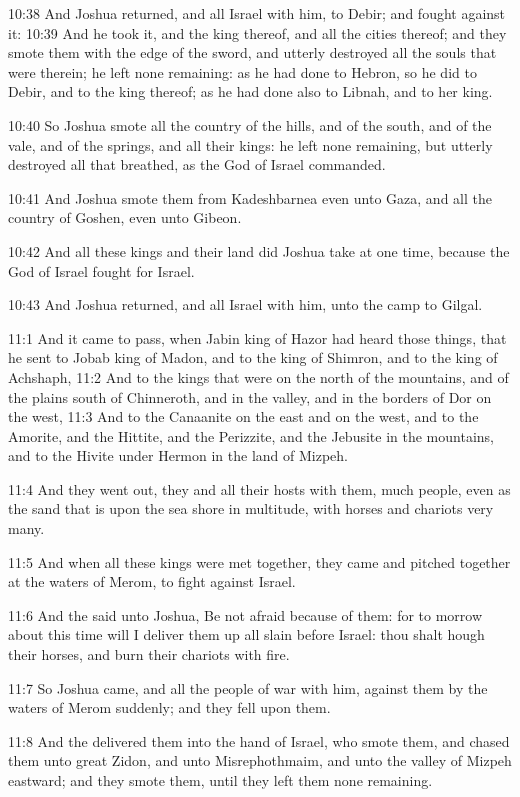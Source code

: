 10:38 And Joshua returned, and all Israel with him, to Debir; and fought against it: 10:39 And he took it, and the king thereof, and all the cities thereof; and they smote them with the edge of the sword, and utterly destroyed all the souls that were therein; he left none remaining: as he had done to Hebron, so he did to Debir, and to the king thereof; as he had done also to Libnah, and to her king.

10:40 So Joshua smote all the country of the hills, and of the south, and of the vale, and of the springs, and all their kings: he left none remaining, but utterly destroyed all that breathed, as the \LORD God of Israel commanded.

10:41 And Joshua smote them from Kadeshbarnea even unto Gaza, and all the country of Goshen, even unto Gibeon.

10:42 And all these kings and their land did Joshua take at one time, because the \LORD God of Israel fought for Israel.

10:43 And Joshua returned, and all Israel with him, unto the camp to Gilgal.

11:1 And it came to pass, when Jabin king of Hazor had heard those things, that he sent to Jobab king of Madon, and to the king of Shimron, and to the king of Achshaph, 11:2 And to the kings that were on the north of the mountains, and of the plains south of Chinneroth, and in the valley, and in the borders of Dor on the west, 11:3 And to the Canaanite on the east and on the west, and to the Amorite, and the Hittite, and the Perizzite, and the Jebusite in the mountains, and to the Hivite under Hermon in the land of Mizpeh.

11:4 And they went out, they and all their hosts with them, much people, even as the sand that is upon the sea shore in multitude, with horses and chariots very many.

11:5 And when all these kings were met together, they came and pitched together at the waters of Merom, to fight against Israel.

11:6 And the \LORD said unto Joshua, Be not afraid because of them: for to morrow about this time will I deliver them up all slain before Israel: thou shalt hough their horses, and burn their chariots with fire.

11:7 So Joshua came, and all the people of war with him, against them by the waters of Merom suddenly; and they fell upon them.

11:8 And the \LORD delivered them into the hand of Israel, who smote them, and chased them unto great Zidon, and unto Misrephothmaim, and unto the valley of Mizpeh eastward; and they smote them, until they left them none remaining.

